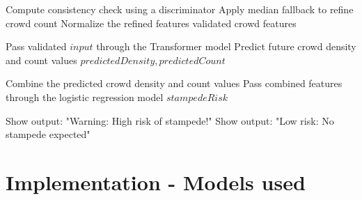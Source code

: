 \documentclass[11pt]{report}
\begin{document}
\begin{algorithm}[H]
\caption{Validate and Preprocess Input Data}
\begin{algorithmic}[1]
    \State Compute consistency check using a discriminator
        \State Apply median fallback to refine crowd count
    \EndIf
    \State Normalize the refined features
    \State \Return validated crowd features
\EndFunction
\end{algorithmic}
\end{algorithm}

\begin{algorithm}[H]
\caption{Predict Future Crowd Values}
\begin{algorithmic}[1]
    \State Pass validated $input$ through the Transformer model
    \State Predict future crowd density and count values
    \State \Return $predictedDensity, predictedCount$
\EndFunction
\end{algorithmic}
\end{algorithm}

\begin{algorithm}[H]
\caption{Assess Stampede Risk}
\begin{algorithmic}[1]
    \State Combine the predicted crowd density and count values
    \State Pass combined features through the logistic regression model
    \State \Return $stampedeRisk$
\EndFunction
\end{algorithmic}
\end{algorithm}

\begin{algorithm}[H]
\caption{Display Stampede Risk}
\begin{algorithmic}[1]
        \State Show output: "Warning: High risk of stampede!"
    \Else
        \State Show output: "Low risk: No stampede expected"
    \EndIf
\EndFunction
\end{algorithmic}
\end{algorithm}

\section {Implementation - Models used}
\end{document}
